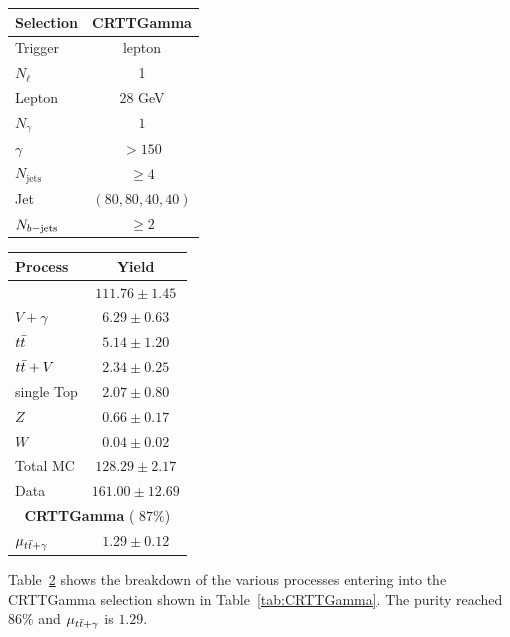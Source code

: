 		\begin{table}
			\parbox{.45\linewidth}{
			\centering
			\label{tab:CRTTGamma}
		   	\begin{tabular}{lc}
			      \toprule
			      \textbf{Selection}  & \textbf{CRTTGamma}     \\
			      \toprule
			      Trigger & lepton \\ 
			      $N_{\ell}$ & 1 \\
			      Lepton \pt & $28$ GeV \\
			      \midrule
			      $N_{\gamma}$ & $1$\\
			      $\gamma$ \pT\ & $> 150$ \GeV \\
			      \midrule
			      $N_{\mathrm{jets}}$ & $ \geq 4 $ \\
			      Jet \pT\ & $(80,80,40,40)$ \GeV \\
			      $N_{b\mathrm{-jets}}$ & $\ge 2$ \\
			      \bottomrule
			   \end{tabular}
			}
			\hfill
			\parbox{.45\linewidth}{
			\centering
			\label{tab:CRTTGamma_yields}
				\begin{tabular}{lc}
					\toprule
					\textbf{Process} & \textbf{Yield} \\
					\toprule
					\ttgamma & $111.76 \pm 1.45$ \\
					$V+\gamma$ & $6.29 \pm 0.63$ \\
					$t\bar{t}$ & $5.14 \pm 1.20$ \\
					$t\bar{t}+V$ & $2.34 \pm 0.25$ \\
					single Top & $2.07 \pm 0.80$ \\
					$Z$ & $0.66 \pm 0.17$ \\
					$W$ & $0.04 \pm 0.02$ \\
					\midrule
					Total MC & $128.29 \pm 2.17$ \\
					Data & $161.00 \pm 12.69$ \\
					\midrule
					\multicolumn{2}{c}{\textbf{CRTTGamma} ( $87\%$)} \\ 
					\midrule
					$\mu_{t\bar{t}+\gamma}$ & $1.29 \pm 0.12$ \\
					\bottomrule
				\end{tabular}
			}
		\end{table}

		Table~\ref{tab:CRTTGamma_yields} shows the breakdown of the various processes entering into the CRTTGamma selection shown in Table~\ref{tab:CRTTGamma}. The purity reached $86\%$ and $\mu_{t\bar{t}+\gamma}$ is $1.29$. 



